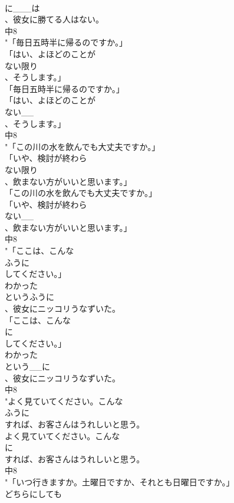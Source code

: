\documentclass[8pt]{extreport}
\begin{document}
\begin{CJK}{UTF8}{min}
\\	に___は
\\	、彼女に勝てる人はない。
\\	中8
\\	"「毎日五時半に帰るのですか。」
\\	「はい、よほどのことが
\\	ない限り
\\	、そうします。」
\\	「毎日五時半に帰るのですか。」
\\	「はい、よほどのことが
\\	ない__
\\	、そうします。」
\\	中8
\\	"「この川の水を飲んでも大丈夫ですか。」
\\	「いや、検討が終わら
\\	ない限り
\\	、飲まない方がいいと思います。」
\\	「この川の水を飲んでも大丈夫ですか。」
\\	「いや、検討が終わら
\\	ない__
\\	、飲まない方がいいと思います。」
\\	中8
\\	"「ここは、こんな
\\	ふうに
\\	してください。」
\\	わかった
\\	というふうに
\\	、彼女にニッコリうなずいた。
\\	「ここは、こんな
\\	に
\\	してください。」
\\	わかった
\\	という__に
\\	、彼女にニッコリうなずいた。
\\	中8
\\	"よく見ていてください。こんな
\\	ふうに
\\	すれば、お客さんはうれしいと思う。
\\	よく見ていてください。こんな
\\	に
\\	すれば、お客さんはうれしいと思う。
\\	中8
\\	"「いつ行きますか。土曜日ですか、それとも日曜日ですか。」
\\	どちらにしても

\end{CJK}
\end{document}
